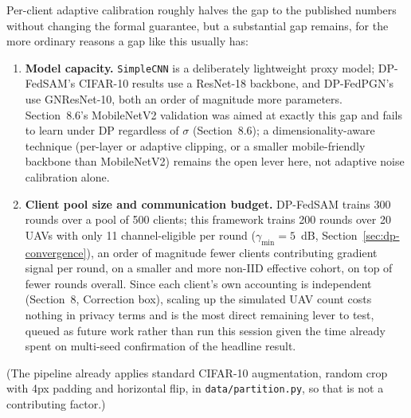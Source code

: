 \documentclass[12pt,a4paper]{article}
\begin{document}
Per-client adaptive calibration roughly halves the gap to the published
numbers without changing the formal guarantee, but a substantial gap
remains, for the more ordinary reasons a gap like this usually has:

\begin{enumerate}
  \item \textbf{Model capacity.} \texttt{SimpleCNN} is a deliberately lightweight
  proxy model; DP-FedSAM's CIFAR-10 results use a ResNet-18 backbone, and
  DP-FedPGN's use GNResNet-10, both an order of magnitude more parameters.
  Section~8.6's MobileNetV2 validation was aimed at exactly this gap and
  fails to learn under DP regardless of $\sigma$ (Section~8.6); a
  dimensionality-aware technique (per-layer or adaptive clipping, or a
  smaller mobile-friendly backbone than MobileNetV2) remains the open
  lever here, not adaptive noise calibration alone.
  \item \textbf{Client pool size and communication budget.} DP-FedSAM trains
  300 rounds over a pool of 500 clients; this framework trains 200 rounds
  over 20 UAVs with only 11 channel-eligible per round
  ($\gamma_{\min}=5$~dB, Section~\ref{sec:dp-convergence}), an order of
  magnitude fewer clients contributing gradient signal per round, on a
  smaller and more non-IID effective cohort, on top of fewer rounds
  overall. Since each client's own accounting is independent (Section~8,
  Correction box), scaling up the simulated UAV count costs nothing in
  privacy terms and is the most direct remaining lever to test, queued as
  future work rather than run this session given the time already spent
  on multi-seed confirmation of the headline result.
\end{enumerate}

(The pipeline already applies standard CIFAR-10 augmentation, random crop
with 4px padding and horizontal flip, in \texttt{data/partition.py}, so
that is not a contributing factor.)
\end{document}
